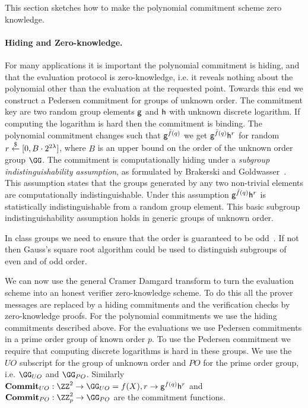 This section sketches how to make the polynomial commitment scheme zero knowledge. 

\paragraph{Hiding and Zero-knowledge.} For many applications it is important the polynomial commitment is hiding, and that the evaluation protocol is zero-knowledge, i.e. it reveals nothing about the polynomial other than the evaluation at the requested point.
Towards this end we construct a Pedersen commitment for groups of unknown order.
The commitment key are two random group elements $\mathsf{g}$ and $\mathsf{h}$ with unknown discrete logarithm. If computing the logarithm is hard then the commitment is binding.
 The polynomial commitment changes such that $\mathsf{g}^{\bar{f}(q)}$ we get $\mathsf{g}^{\bar{f}(q)}\mathsf{h}^{r}$ for random $r \overset{\$}{\gets} [0, B\cdot 2^{2\lambda}]$, where $B$ is an upper bound on the order of the unknown order group $\GG$.  
The commitment is computationally hiding under a \emph{subgroup indistinguishability assumption}, as formulated by Brakerski and Goldwasser~\cite{C:BraGol10}. This assumption states that the groups generated by any two non-trivial elements are computationally indistinguishable. Under this assumption $\mathsf{g}^{\bar{f}(q)}\mathsf{h}^r$ is statistically indistinguishable from a random group element.
This basic subgroup indistinguishability assumption holds in generic groups of unknown order. 

In class groups we need to ensure that the order is guaranteed to be odd~\cite{PKC/BucHam01}. If not then Gauss's square root algorithm could be used to distinguish subgroups of even and of odd order.

We can now use the general Cramer Damgard\cite{C:CraDam98} transform to turn the evaluation scheme into an honest verifier zero-knowledge scheme.  
To do this all the prover messages are replaced by a hiding commitments and the verification checks by zero-knowledge proofs. For the polynomial commitments we use the hiding commitments described above. For the evaluations we use Pedersen commitments\cite{C:Pedersen91} in a prime order group of known order $p$. To use the Pedersen commitment we require that computing discrete logarithms is hard in these groups. 
We use the ${UO}$ subscript for the group of unknown order and $PO$ for the prime order group, i.e. $\GG_{UO}$ and $\GG_{PO}$.
Similarly $\commit_{UO}:\ZZ^2 \rightarrow\GG_{UO}=f(X),r \rightarrow \gr{g}^{f(q)}\gr{h}^{r}$ and $\commit_{PO}:\ZZ_p^2\rightarrow \GG_{PO}$ are the commitment functions.

